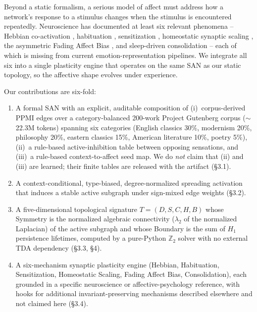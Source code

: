 \documentclass{article}
\begin{document}
Beyond a static formalism, a serious model of affect must address how a
network's response to a stimulus changes when the stimulus is encountered
repeatedly. Neuroscience has documented at least six relevant phenomena --
Hebbian co-activation \cite{hebb1949organization}, habituation
\cite{thompson1966habituation, rankin2009habituation}, sensitization
\cite{groves1970habituation}, homeostatic synaptic scaling
\cite{turrigiano2008homeostatic}, the asymmetric Fading Affect Bias
\cite{walker2009fab}, and sleep-driven consolidation
\cite{diekelmann2010memory} -- each of which is missing from current
emotion-representation pipelines. We integrate all six into a single
plasticity engine that operates on the same SAN as our static topology, so
the affective shape evolves under experience.

Our contributions are six-fold:
\begin{enumerate}
    \item A formal SAN with an explicit, auditable composition of
      (i)~corpus-derived PPMI edges over a category-balanced 200-work
      Project Gutenberg corpus ($\sim$22.3M tokens) spanning six categories
      (English classics 30\%, modernism 20\%, philosophy 20\%, eastern classics
      15\%, American literature 10\%, poetry 5\%),
      (ii)~a rule-based active-inhibition table between opposing sensations,
      and (iii)~a rule-based context-to-affect seed map. We do \emph{not}
      claim that (ii) and (iii) are learned; their finite tables are released
      with the artifact (\S 3.1).
    \item A context-conditional, type-biased, degree-normalized spreading
      activation that induces a stable active subgraph under sign-mixed
      edge weights (\S 3.2).
    \item A five-dimensional topological signature
      $T = (D, S, C, H, B)$ whose Symmetry is the normalized algebraic
      connectivity ($\lambda_2$ of the normalized Laplacian) of the active
      subgraph and whose Boundary is the sum of $H_1$ persistence lifetimes,
      computed by a pure-Python $\mathbb{Z}_2$ solver with no external TDA
      dependency (\S 3.3, \S 4).
    \item A six-mechanism synaptic plasticity engine (Hebbian, Habituation,
      Sensitization, Homeostatic Scaling, Fading Affect Bias, Consolidation),
      each grounded in a specific neuroscience or affective-psychology
      reference, with hooks for additional invariant-preserving mechanisms
      described elsewhere and not claimed here (\S 3.4).

\end{enumerate}
\end{document}
